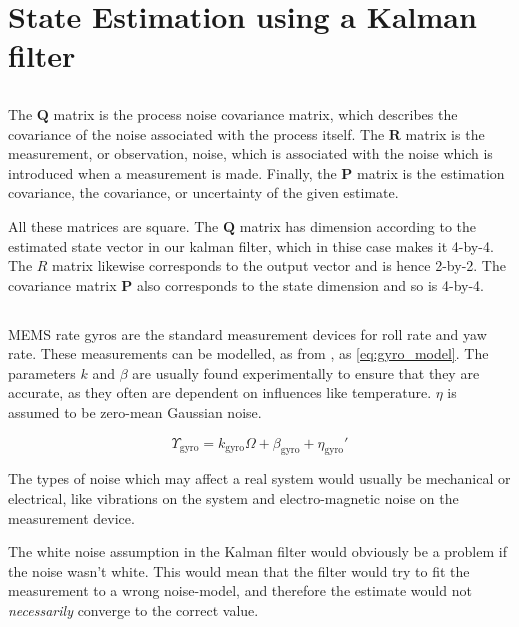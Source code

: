 \section{State Estimation using a Kalman filter}

\subsection{} %
The $\mathbf{Q}$ matrix is the process noise covariance matrix, which describes the covariance of the noise associated with the process itself.  The $\mathbf{R}$ matrix is the measurement, or observation, noise, which is associated with the noise which is introduced when a measurement is made. Finally, the $\mathbf{P}$ matrix is the estimation covariance, the covariance, or uncertainty of the given estimate.

All these matrices are square. The $\mathbf{Q}$ matrix has dimension according to the estimated state vector in our kalman filter, which in thise case makes it 4-by-4. The $R$ matrix likewise corresponds to the output vector and is hence 2-by-2. The covariance matrix $\mathbf{P}$ also corresponds to the state dimension and so is 4-by-4.

\subsection{} %
MEMS rate gyros are the standard measurement devices for roll rate and yaw rate. These measurements can be modelled, as from \cite[p. 125]{beard_mclain_2012}, as \eqref{eq:gyro_model}. The parameters $k$ and $\beta$ are usually found experimentally to ensure that they are accurate, as they often are dependent on influences like temperature. $\eta$ is assumed to be zero-mean Gaussian noise. 

\begin{equation}
    \label{eq:gyro_model}
    \Upsilon_{\text{gyro}} = k_{\text{gyro}} \Omega + \beta_{\text{gyro}} + \eta_{\text{gyro}}'
\end{equation}

The types of noise which may affect a real system would usually be mechanical or electrical, like vibrations on the system and electro-magnetic noise on the measurement device. 

The white noise assumption in the Kalman filter would obviously be a problem if the noise wasn't white. This would mean that the filter would try to fit the measurement to a wrong noise-model, and therefore the estimate would not \textit{necessarily} converge to the correct value. 

